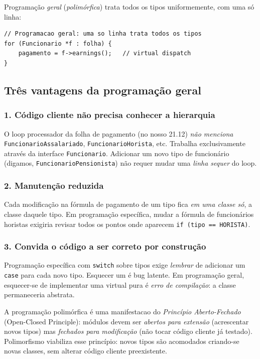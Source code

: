 \documentclass[11pt,a4paper]{article}
\begin{document}
Programa\c{c}\~ao \emph{geral} (\emph{polim\'orfica}) trata todos os tipos uniformemente, com uma s\'o linha:

\begin{lstlisting}[style=cppcode,numbers=none]
// Programacao geral: uma so linha trata todos os tipos
for (Funcionario *f : folha) {
    pagamento = f->earnings();   // virtual dispatch
}
\end{lstlisting}

\subsection*{Tr\^es vantagens da programa\c{c}\~ao geral}

\subsubsection*{1. C\'odigo cliente n\~ao precisa conhecer a hierarquia}

O loop processador da folha de pagamento (no nosso 21.12) \emph{n\~ao menciona} \texttt{FuncionarioAssalariado}, \texttt{FuncionarioHorista}, etc. Trabalha exclusivamente atrav\'es da interface \texttt{Funcionario}. Adicionar um novo tipo de funcion\'ario (digamos, \texttt{FuncionarioPensionista}) n\~ao requer mudar uma \emph{linha sequer} do loop.

\subsubsection*{2. Manuten\c{c}\~ao reduzida}

Cada modifica\c{c}\~ao na f\'ormula de pagamento de um tipo fica \emph{em uma classe s\'o}, a classe daquele tipo. Em programa\c{c}\~ao espec\'ifica, mudar a f\'ormula de funcion\'arios horistas exigiria revisar todos os pontos onde aparecem \texttt{if (tipo == HORISTA)}.

\subsubsection*{3. Convida o c\'odigo a ser correto por constru\c{c}\~ao}

Programa\c{c}\~ao espec\'ifica com \texttt{switch} sobre tipos exige \emph{lembrar} de adicionar um \texttt{case} para cada novo tipo. Esquecer um \'e bug latente. Em programa\c{c}\~ao geral, esquecer-se de implementar uma virtual pura \'e \emph{erro de compila\c{c}\~ao}: a classe permaneceria abstrata.

\begin{obseng}
A programa\c{c}\~ao polim\'orfica \'e uma manifestacao do \emph{Princ\'ipio Aberto-Fechado} (Open-Closed Principle): m\'odulos devem ser \emph{abertos para extens\~ao} (acrescentar novos tipos) mas \emph{fechados para modifica\c{c}\~ao} (n\~ao tocar c\'odigo cliente j\'a testado). Polimorfismo viabiliza esse princ\'ipio: novos tipos s\~ao acomodados criando-se novas classes, sem alterar c\'odigo cliente preexistente.
\end{obseng}
\end{document}
